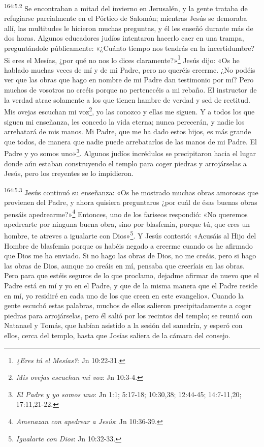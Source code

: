 \par
\textsuperscript{164:5.2} Se encontraban a mitad del invierno en Jerusalén, y la gente trataba de refugiarse parcialmente en el Pórtico de Salomón; mientras Jesús se demoraba allí, las multitudes le hicieron muchas preguntas, y él les enseñó durante más de dos horas. Algunos educadores judíos intentaron hacerlo caer en una trampa, preguntándole públicamente: «¿Cuánto tiempo nos tendrás en la incertidumbre? Si eres el Mesías, ¿por qué no nos lo dices claramente?»\footnote{\textit{¿Eres tú el Mesías?}: Jn 10:22-31.} Jesús dijo: «Os he hablado muchas veces de mí y de mi Padre, pero no queréis creerme. ¿No podéis ver que las obras que hago en nombre de mi Padre dan testimonio por mí? Pero muchos de vosotros no creéis porque no pertenecéis a mi rebaño. El instructor de la verdad atrae solamente a los que tienen hambre de verdad y sed de rectitud. Mis ovejas escuchan mi voz\footnote{\textit{Mis ovejas escuchan mi voz}: Jn 10:3-4.}, yo las conozco y ellas me siguen. Y a todos los que siguen mi enseñanza, les concedo la vida eterna; nunca perecerán, y nadie los arrebatará de mis manos. Mi Padre, que me ha dado estos hijos, es más grande que todos, de manera que nadie puede arrebatarlos de las manos de mi Padre. El Padre y yo somos uno»\footnote{\textit{El Padre y yo somos uno}: Jn 1:1; 5:17-18; 10:30,38; 12:44-45; 14:7-11,20; 17:11,21-22.}. Algunos judíos incrédulos se precipitaron hacia el lugar donde aún estaban construyendo el templo para coger piedras y arrojárselas a Jesús, pero los creyentes se lo impidieron.

\par
\textsuperscript{164:5.3} Jesús continuó su enseñanza: «Os he mostrado muchas obras amorosas que provienen del Padre, y ahora quisiera preguntaros ¿por cuál de ésas buenas obras pensáis apedrearme?»\footnote{\textit{Amenazan con apedrear a Jesús}: Jn 10:36-39.} Entonces, uno de los fariseos respondió: «No queremos apedrearte por ninguna buena obra, sino por blasfemia, porque tú, que eres un hombre, te atreves a igualarte con Dios»\footnote{\textit{Igualarte con Dios}: Jn 10:32-33.}. Y Jesús contestó: «Acusáis al Hijo del Hombre de blasfemia porque os habéis negado a creerme cuando os he afirmado que Dios me ha enviado. Si no hago las obras de Dios, no me creáis, pero si hago las obras de Dios, aunque no creáis en mí, pensaba que creeríais en las obras. Pero para que estéis seguros de lo que proclamo, dejadme afirmar de nuevo que el Padre está en mí y yo en el Padre, y que de la misma manera que el Padre reside en mí, yo residiré en cada uno de los que creen en este evangelio». Cuando la gente escuchó estas palabras, muchos de ellos salieron precipitadamente a coger piedras para arrojárselas, pero él salió por los recintos del templo; se reunió con Natanael y Tomás, que habían asistido a la sesión del sanedrín, y esperó con ellos, cerca del templo, hasta que Josías saliera de la cámara del consejo.

